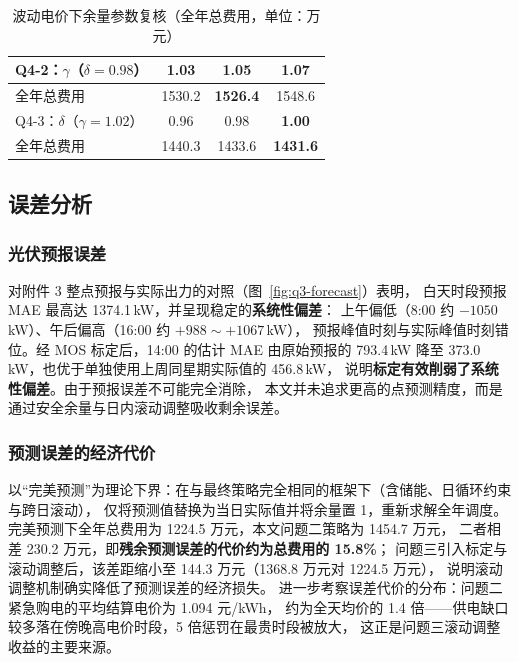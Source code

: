 \begin{table}[!htbp]
\caption{波动电价下余量参数复核（全年总费用，单位：万元）}\label{tab:sens-q4}
\centering
\small
\begin{tabular}{lccc}
\toprule
Q4-2：$\gamma$（$\delta=0.98$） & 1.03 & \textbf{1.05} & 1.07 \\
\midrule
全年总费用 & 1530.2 & \textbf{1526.4} & 1548.6 \\
\midrule
Q4-3：$\delta$（$\gamma=1.02$） & 0.96 & 0.98 & \textbf{1.00} \\
\midrule
全年总费用 & 1440.3 & 1433.6 & \textbf{1431.6} \\
\bottomrule
\end{tabular}
\end{table}

\subsection{误差分析}

\subsubsection{光伏预报误差}
对附件 3 整点预报与实际出力的对照（图~\ref{fig:q3-forecast}）表明，
白天时段预报 MAE 最高达 1374.1\,kW，并呈现稳定的\textbf{系统性偏差}：
上午偏低（8:00 约 $-1050$\,kW）、午后偏高（16:00 约 $+988\sim+1067$\,kW），
预报峰值时刻与实际峰值时刻错位。经 MOS 标定后，14:00 的估计 MAE 由原始预报的 793.4\,kW
降至 373.0\,kW，也优于单独使用上周同星期实际值的 456.8\,kW，
说明\textbf{标定有效削弱了系统性偏差}。由于预报误差不可能完全消除，
本文并未追求更高的点预测精度，而是通过安全余量与日内滚动调整吸收剩余误差。

\subsubsection{预测误差的经济代价}
以“完美预测”为理论下界：在与最终策略完全相同的框架下（含储能、日循环约束与跨日滚动），
仅将预测值替换为当日实际值并将余量置 1，重新求解全年调度。
完美预测下全年总费用为 1224.5 万元，本文问题二策略为 1454.7 万元，
二者相差 230.2 万元，即\textbf{残余预测误差的代价约为总费用的 15.8\%}；
问题三引入标定与滚动调整后，该差距缩小至 144.3 万元（1368.8 万元对 1224.5 万元），
说明滚动调整机制确实降低了预测误差的经济损失。
进一步考察误差代价的分布：问题二紧急购电的平均结算电价为 1.094 元/kWh，
约为全天均价的 1.4 倍——供电缺口较多落在傍晚高电价时段，5 倍惩罚在最贵时段被放大，
这正是问题三滚动调整收益的主要来源。

